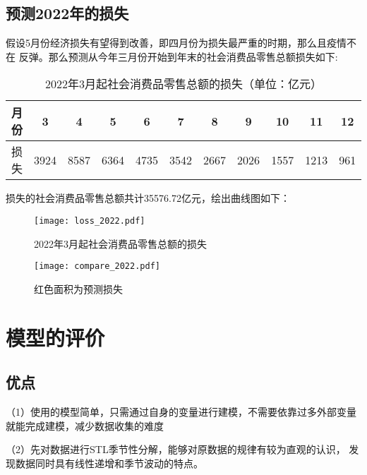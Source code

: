 \documentclass[12pt,a4paper]{nmmcm}
\begin{document}
  \subsection{预测2022年的损失}
  假设5月份经济损失有望得到改善，即四月份为损失最严重的时期，那么且疫情不在
  反弹。那么预测从今年三月份开始到年末的社会消费品零售总额损失如下:
  \begin{table}[H]
    \centering
    \caption{2022年3月起社会消费品零售总额的损失（单位：亿元）}
      \begin{tabular}{ccccccccccc}
      月份    & 3     & 4     & 5     & 6     & 7     & 8     & 9     & 10    & 11    & 12 \\
      \hline
      损失    & 3924 & 8587 & 6364 & 4735 & 3542 & 2667 & 2026 & 1557 & 1213 & 961 \\
      \end{tabular}%
    \label{loss_2020_table}%
  \end{table}%
  损失的社会消费品零售总额共计35576.72亿元，绘出曲线图如下：\nocite{yandou}
  \begin{figure}[H] %
    \centering %
    \begin{minipage}[t]{0.4\textwidth}
      \centering
      \texttt{[image: loss\_2022.pdf]} %
      \caption{2022年3月起社会消费品零售总额的损失} %
      \label{loss_2022} %
    \end{minipage}
    \begin{minipage}[t]{0.4\textwidth}
      \centering %
      \texttt{[image: compare\_2022.pdf]} %
      \caption{红色面积为预测损失} %
      \label{compare_2022} %
    \end{minipage}
  \end{figure} 
  \section{模型的评价}
  \subsection{优点}
  （1）使用的模型简单，只需通过自身的变量进行建模，不需要依靠过多外部变量
  就能完成建模，减少数据收集的难度

  （2）先对数据进行STL季节性分解，能够对原数据的规律有较为直观的认识，
  发现数据同时具有线性递增和季节波动的特点。
\end{document}
